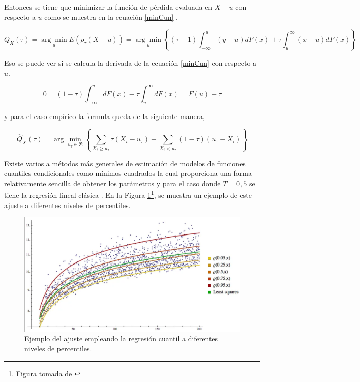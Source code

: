     Entonces se tiene que minimizar la función de pérdida evaluada en $X-u$ con respecto a $u$ como se muestra en la ecuación \eqref{minCun} \cite{Koenker2005}.
    
    \begin{equation}\label{minCun}
        Q_X(\tau)=\underset{u}{\arg \min } E\left(\rho_\tau(X-u)\right)=\underset{u}{\arg \min }\left\{(\tau-1) \int_{-\infty}^u(y-u) d F(x)+\tau \int_u^{\infty}(x-u) d F(x)\right\} 
    \end{equation}

    Eso se puede ver si se calcula la derivada de la ecuación \eqref{minCun} con respecto a $u$.

    \begin{equation}
        0=(1-\tau) \int_{-\infty}^{u} d F(x)-\tau \int_{u}^{\infty} d F(x)=F(u)-\tau
    \end{equation}

    y para el caso empírico la formula queda de la siguiente manera, 

    \begin{equation}\label{qestima}
        \widehat{Q}_{X}(\tau)=\arg \min _{u_\tau \in \Re}\left\{\sum_{X_i \geq u_\tau} \tau \left(X_i-u_\tau\right)+\sum_{X_i< u_\tau}(1-\tau) \left(u_\tau-X_i\right)\right\}
    \end{equation}

    Existe varios a métodos más generales de estimación de modelos de funciones cuantiles condicionales como mínimos cuadrados la cual proporciona una forma relativamente sencilla de obtener los parámetros y para el caso donde $T = 0,5$ se tiene la regresión lineal clásica \cite{Koenker2005}. En la Figura \ref{fig:regQ}\footnote{Figura tomada de \cite{ImgRegCuantile}}, se muestra un ejemplo de este ajuste a diferentes niveles de percentiles.

    \begin{figure}[H]
    \centering
    \includegraphics[width = 0.9 \textwidth]{Imagenes/Quantilsregression.png}
    \caption{Ejemplo del ajuste empleando la regresión cuantil a diferentes niveles de percentiles.}
    \label{fig:regQ}
    \end{figure}
    
